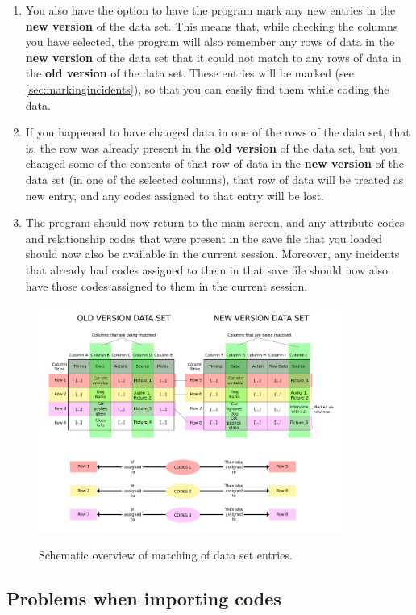 \documentclass{memoir}
\begin{document}
\begin{enumerate}
\item{You also have the option to have the program mark any new entries in the \textbf{new version} of the data set. This means that, while checking the columns you have selected, the program will also remember any rows of data in the \textbf{new version} of the data set that it could not match to any rows of data in the \textbf{old version} of the data set. These entries will be marked (see \ref{sec:markingincidents}), so that you can easily find them while coding the data.}
\item{If you happened to have changed data in one of the rows of the data set, that is, the row was already present in the \textbf{old version} of the data set, but you changed some of the contents of that row of data in the \textbf{new version} of the data set (in one of the selected columns), that row of data will be treated as new entry, and any codes assigned to that entry will be lost.}
\item{The program should now return to the main screen, and any attribute codes and relationship codes that were present in the save file that you loaded should now also be available in the current session. Moreover, any incidents that already had codes assigned to them in that save file should now also have those codes assigned to them in the current session.}
\end{enumerate}



\begin{figure}[h!]
  \centering
  \caption{Schematic overview of matching of data set entries.}
  \includegraphics[width=100mm]{Diagram_1.pdf}
  \label{fig:importingcodesdiagram}
\end{figure}


\subsection{Problems when importing codes}
\label{sec:problemsimportingcodes}
\end{document}
